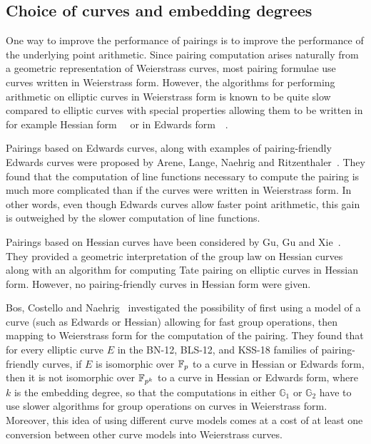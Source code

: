 
\subsection{Choice of curves and embedding degrees}

One way to improve the performance of pairings is
to improve the performance of the underlying point arithmetic.
Since pairing computation arises naturally from a geometric representation of Weierstrass curves,
most pairing formulae use curves written in Weierstrass form.
However, the algorithms for performing arithmetic on elliptic curves in Weierstrass form is known to be quite slow compared to elliptic curves with special properties allowing them to be written in
for example Hessian form~\cite{2001/smart}~\cite{2001/joye} or in
Edwards form~\cite{2007/edwards}~\cite{2007/bernstein-newelliptic}.

Pairings based on Edwards curves,
along with examples of pairing-friendly Edwards curves
were proposed by Arene, Lange, Naehrig and Ritzenthaler~\cite{2009/fastertate}.
They found that the computation of line functions necessary to compute the pairing is much more complicated than if the curves were written in Weierstrass form.
In other words,
even though Edwards curves allow faster point arithmetic,
this gain is outweighed by the slower computation of line functions.

Pairings based on Hessian curves have been considered by Gu, Gu and Xie~\cite{2010/Gu}.
They provided a geometric interpretation of the group law on Hessian curves
along with an algorithm for computing Tate pairing on elliptic curves in Hessian form.
However, no pairing-friendly curves in Hessian form were given.

Bos, Costello and Naehrig~\cite{2013/bos-pairing} investigated the possibility of first
using a model of a curve (such as Edwards or Hessian) allowing for fast group operations, then mapping to Weierstrass form for the computation of the pairing.
They found that for every elliptic curve $E$ in the BN-12, BLS-12, and KSS-18 families of pairing-friendly curves, if $E$ is isomorphic over $\mathbb{F}_{p}$ to a curve in Hessian or Edwards form, then it is not isomorphic over $\mathbb{F}_{p^{k}}$ to a curve in Hessian or Edwards form, where $k$ is the embedding degree, so that the computations in either $\mathbb{G}_1$ or $\mathbb{G}_2$ have to use slower algorithms for group operations on curves in Weierstrass form. Moreover, this idea of using different curve models comes at a cost of at least one conversion
between other curve models into Weierstrass curves.

